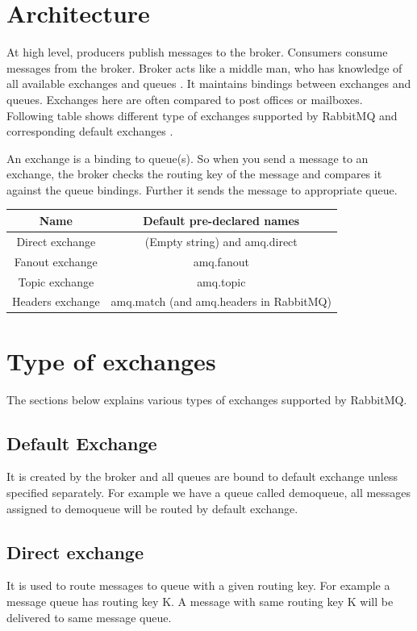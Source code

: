 \documentclass[9pt,twocolumn,twoside]{../../styles/osajnl}
\begin{document}
\section{Architecture}
At high level, producers publish messages to the broker. Consumers consume
messages from the broker. Broker acts like a middle man, who has knowledge of
all available exchanges and queues \cite{videla2012rabbitmq}. It maintains
bindings between exchanges and queues. Exchanges here are often compared to post
offices or mailboxes.  Following table shows different type of exchanges
supported by RabbitMQ and corresponding default exchanges
\cite{www-rabbitmq-pivotal} .

An exchange is a binding to queue(s). So when you send a
message to an exchange, the broker checks the routing key of the message
and compares it against the queue bindings. Further it sends the message to
appropriate queue.

\begin{center}
 \begin{tabular}{||c c||} 
 \hline
 Name & Default pre-declared names \\ [0.5ex] 
 \hline\hline
 Direct exchange & (Empty string) and amq.direct  \\ 
 \hline
 Fanout exchange & amq.fanout  \\
 \hline
 Topic exchange & amq.topic  \\
 \hline
 Headers exchange & amq.match (and amq.headers in RabbitMQ) \\
 \hline
\end{tabular}
\end{center}

\section{Type of exchanges}
\label{sec:examples}

The sections below explains various types of exchanges supported by RabbitMQ.

\subsection{Default Exchange}
It is created by the broker and all queues are bound to default exchange unless 
specified separately. For example we have a queue called demoqueue, all messages 
assigned to demoqueue will be routed by default exchange.

\subsection{Direct exchange}
It is used to route messages to queue with a given routing key. For example a 
message queue has routing key K. A message with same routing key K will be 
delivered to same message queue.
\end{document}
